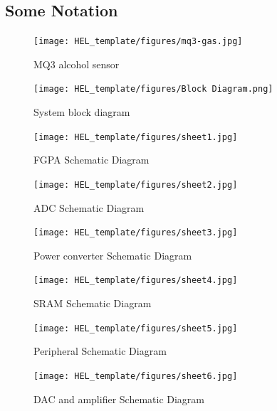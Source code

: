 \documentclass[12pt]{article}
\begin{document}
\clearpage
{}%
\renewcommand*{\thepage}{A\arabic{page}}
\begin{appendices}
\section{Some Notation}

\begin{figure}[h]
    \centering
    \texttt{[image: HEL\_template/figures/mq3-gas.jpg]}
    \caption{MQ3 alcohol sensor \cite{img1}}
    \label{fig:alcohol sensor}
\end{figure}

\begin{figure}[h]
    \centering
    \texttt{[image: HEL\_template/figures/Block Diagram.png]}
    \caption{System block diagram}
    \label{fig:block diagram}
\end{figure}

\begin{figure}[h]
    \centering
    \texttt{[image: HEL\_template/figures/sheet1.jpg]}
    \caption{FGPA Schematic Diagram}
    \label{fig:FGPA Schematic Diagram}
\end{figure}

\begin{figure}[h]
    \centering
    \texttt{[image: HEL\_template/figures/sheet2.jpg]}
    \caption{ADC Schematic Diagram}
    \label{fig:Schematic Diagram}
\end{figure}

\begin{figure}[h]
    \centering
    \texttt{[image: HEL\_template/figures/sheet3.jpg]}
    \caption{Power converter Schematic Diagram}
    \label{fig:Power converter Schematic Diagram}
\end{figure}

\begin{figure}[h]
    \centering
    \texttt{[image: HEL\_template/figures/sheet4.jpg]}
    \caption{SRAM Schematic Diagram}
    \label{fig:SRAM Schematic Diagram}
\end{figure}

\begin{figure}[h]
    \centering
    \texttt{[image: HEL\_template/figures/sheet5.jpg]}
    \caption{Peripheral Schematic Diagram}
    \label{fig:Peripheral Schematic Diagram}
\end{figure}

\begin{figure}[h]
    \centering
    \texttt{[image: HEL\_template/figures/sheet6.jpg]}
    \caption{DAC and amplifier Schematic Diagram}
    \label{fig:DAC and amplifier Schematic Diagram}
\end{figure}


\end{appendices}
\end{document}
